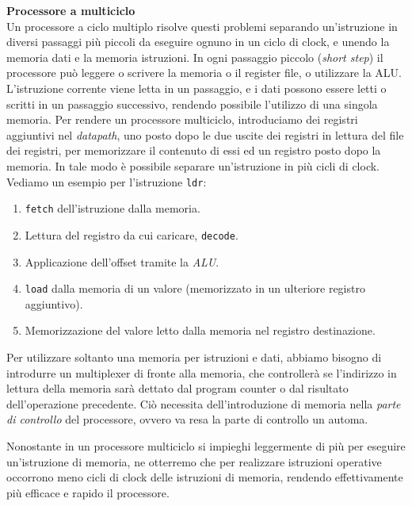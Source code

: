 \begin{defn}
    \textbf{Processore a multiciclo} \\
    Un processore a ciclo multiplo risolve questi problemi separando
    un'istruzione in diversi passaggi più piccoli da eseguire ognuno in un ciclo
    di clock, e unendo la memoria dati e la memoria istruzioni. In ogni
    passaggio piccolo (\textit{short step}) il processore può leggere o scrivere
    la memoria o il register file, o utilizzare la ALU. \@ L'istruzione corrente
    viene letta in un passaggio, e i dati possono essere letti o scritti in un
    passaggio successivo, rendendo possibile l'utilizzo di una singola memoria.
    Per rendere un processore multiciclo, introduciamo dei registri aggiuntivi
    nel \textit{datapath}, uno posto dopo le due uscite dei registri in lettura
    del file dei registri, per memorizzare il contenuto di essi ed un registro
    posto dopo la memoria. In tale modo è possibile separare un'istruzione in
    più cicli di clock. Vediamo un esempio per l'istruzione \texttt{ldr}:

    \begin{enumerate}
        \item \texttt{fetch} dell'istruzione dalla memoria.
        \item Lettura del registro da cui caricare, \texttt{decode}.
        \item Applicazione dell'offset tramite la \textit{ALU}.
        \item \texttt{load} dalla memoria di un valore (memorizzato in un
        ulteriore registro aggiuntivo).
        \item Memorizzazione del valore letto dalla memoria nel registro
        destinazione.
    \end{enumerate}

    Per utilizzare soltanto una memoria per istruzioni e dati, abbiamo bisogno
    di introdurre un multiplexer di fronte alla memoria, che controllerà se
    l'indirizzo in lettura della memoria sarà dettato dal program counter o dal
    risultato dell'operazione precedente. Ciò necessita dell'introduzione di
    memoria nella \textit{parte di controllo} del processore, ovvero va resa la
    parte di controllo un automa.

    Nonostante in un processore multiciclo si impieghi leggermente di più per
    eseguire un'istruzione di memoria, ne otterremo che per realizzare
    istruzioni operative occorrono meno cicli di clock delle istruzioni di
    memoria, rendendo effettivamente più efficace e rapido il processore.
\end{defn}

